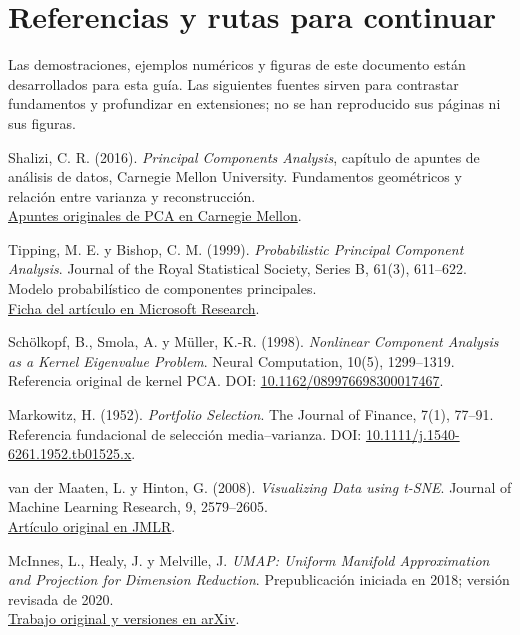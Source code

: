 \documentclass[11pt,a4paper]{article}
\theoremstyle{definition}
\begin{document}
\section{Referencias y rutas para continuar}
Las demostraciones, ejemplos numéricos y figuras de este documento están desarrollados para esta guía. Las siguientes fuentes sirven para contrastar fundamentos y profundizar en extensiones; no se han reproducido sus páginas ni sus figuras.
\begin{enumerate}[label={[\arabic*]},itemsep=5pt]
\item Shalizi, C. R. (2016). \textit{Principal Components Analysis}, capítulo de apuntes de análisis de datos, Carnegie Mellon University. Fundamentos geométricos y relación entre varianza y reconstrucción.\\
\href{https://www.stat.cmu.edu/~cshalizi/uADA/16/lectures/17.pdf}{Apuntes originales de PCA en Carnegie Mellon}.
\item Tipping, M. E. y Bishop, C. M. (1999). \textit{Probabilistic Principal Component Analysis}. Journal of the Royal Statistical Society, Series B, 61(3), 611--622. Modelo probabilístico de componentes principales.\\
\href{https://www.microsoft.com/en-us/research/publication/probabilistic-principal-component-analysis/}{Ficha del artículo en Microsoft Research}.
\item Schölkopf, B., Smola, A. y Müller, K.-R. (1998). \textit{Nonlinear Component Analysis as a Kernel Eigenvalue Problem}. Neural Computation, 10(5), 1299--1319. Referencia original de kernel PCA. DOI: \href{https://doi.org/10.1162/089976698300017467}{10.1162/089976698300017467}.
\item Markowitz, H. (1952). \textit{Portfolio Selection}. The Journal of Finance, 7(1), 77--91. Referencia fundacional de selección media--varianza. DOI: \href{https://doi.org/10.1111/j.1540-6261.1952.tb01525.x}{10.1111/j.1540-6261.1952.tb01525.x}.
\item van der Maaten, L. y Hinton, G. (2008). \textit{Visualizing Data using t-SNE}. Journal of Machine Learning Research, 9, 2579--2605.\\
\href{https://www.jmlr.org/papers/v9/vandermaaten08a.html}{Artículo original en JMLR}.
\item McInnes, L., Healy, J. y Melville, J. \textit{UMAP: Uniform Manifold Approximation and Projection for Dimension Reduction}. Prepublicación iniciada en 2018; versión revisada de 2020.\\
\href{https://arxiv.org/abs/1802.03426}{Trabajo original y versiones en arXiv}.

\end{enumerate}
\end{document}
